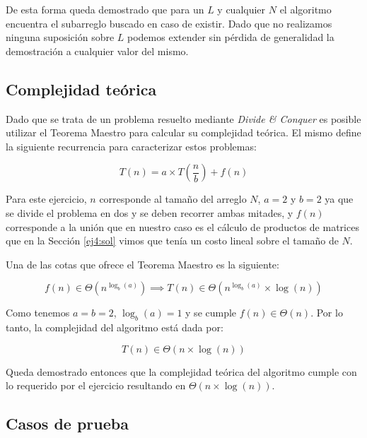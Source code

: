 De esta forma queda demostrado que para un $L$ y cualquier $N$ el algoritmo
encuentra el subarreglo buscado en caso de existir. Dado que no realizamos
ninguna suposición sobre $L$ podemos extender sin pérdida de generalidad la
demostración a cualquier valor del mismo.

\subsection{Complejidad teórica}

Dado que se trata de un problema resuelto mediante \emph{Divide \& Conquer} es
posible utilizar el Teorema Maestro para calcular su complejidad teórica. El
mismo define la siguiente recurrencia para caracterizar estos problemas:

\begin{equation*}
	T\left(n\right) = a \times T\left(\frac{n}{b}\right) + f\left(n\right)
\end{equation*}

Para este ejercicio, $n$ corresponde al tamaño del arreglo $N$, $a = 2$ y $b = 2$ ya que se divide el problema en dos y se
deben recorrer ambas mitades, y $f\left(n\right)$ corresponde a la unión que en
nuestro caso es el cálculo de productos de matrices que en la Sección
\ref{ej4:sol} vimos que tenía un costo lineal sobre el tamaño de $N$.

Una de las cotas que ofrece el Teorema Maestro es la siguiente:

\begin{equation*}
	f\left(n\right) \in \Theta\left(n^{\log_b\left(a\right)}\right)
	\implies T\left(n\right) \in \Theta\left(n^{\log_b\left(a\right)} \times
	\log\left(n\right)\right)
\end{equation*}

Como tenemos $a = b = 2$, $\log_b\left(a\right) = 1$ y se cumple
$f\left(n\right) \in \Theta\left(n\right)$. Por lo tanto, la complejidad del
algoritmo está dada por:

\begin{equation*}
	T\left(n\right) \in \Theta\left(n \times \log\left(n\right)\right)
\end{equation*}

Queda demostrado entonces que la complejidad teórica del algoritmo cumple con lo
requerido por el ejercicio resultando en $\Theta\left(n \times
\log\left(n\right)\right)$.

\subsection{Casos de prueba}

